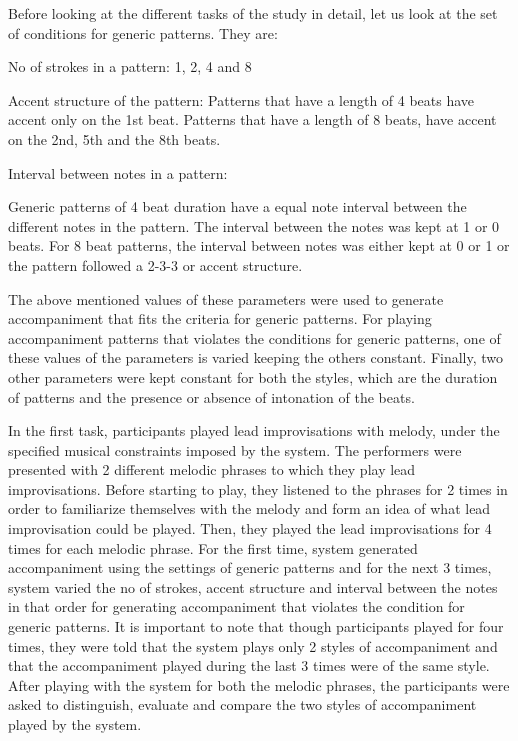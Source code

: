 Before looking at the different tasks of the study in detail, let us look at the set of conditions for generic patterns. They are:

\item No of strokes in a pattern: 1, 2, 4 and 8

\item Accent structure of the pattern:
Patterns that have a length of 4 beats have accent only on the 1st beat. Patterns that have a length of 8 beats, have accent on the 2nd, 5th and the 8th beats. 

\item Interval between notes in a pattern:

Generic patterns of 4 beat duration have a equal note interval between the different notes in the pattern. The interval between the notes was kept at 1 or 0 beats. For 8 beat patterns, the interval between notes was either kept at 0 or 1 or the pattern followed a 2-3-3 or accent structure.

The above mentioned values of these parameters were used to generate accompaniment that fits the criteria for generic patterns. For playing accompaniment patterns that violates the conditions for generic patterns, one of these values of the parameters is varied keeping the others constant. Finally, two other parameters were kept constant for both the styles, which are the duration of patterns and the presence or absence of intonation of the beats. 


In the first task, participants played lead improvisations with melody, under the specified musical constraints imposed by the system. The performers were presented with 2 different melodic phrases to which they play lead improvisations. Before starting to play, they listened to the phrases for 2 times in order to familiarize themselves with the melody and form an idea of what lead improvisation could be played. Then, they played the lead improvisations for 4 times for each melodic phrase. For the first time, system generated accompaniment using the settings of generic patterns and for the next 3 times, system varied the no of strokes, accent structure and interval between the notes in that order for generating accompaniment that violates the condition for generic patterns. It is important to note that though participants played for four times, they were told that the system plays only 2 styles of accompaniment and that the accompaniment played during the last 3 times were of the same style. After playing with the system for both the melodic phrases, the participants were asked to distinguish, evaluate and compare the two styles of accompaniment played by the system. 


